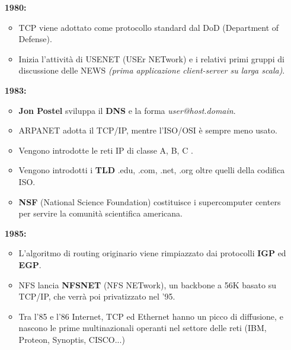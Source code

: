 \documentclass[a4paper,11pt]{article}
\begin{document}
\begin{itemize}
\item[\textbf{1980:}] \begin{itemize}
\item TCP viene adottato come protocollo standard dal DoD (Department of Defense).
\item Inizia l'attività di USENET (USEr NETwork) e i relativi primi gruppi di discussione delle NEWS \textit{(prima applicazione client-server su larga scala)}.
\end{itemize} 

\item[\textbf{1983:}] \begin{itemize}
\item \textbf{Jon Postel} sviluppa il \textbf{DNS} e la forma \textit{user@host.domain}.
\item ARPANET adotta il TCP/IP, mentre l'ISO/OSI è sempre meno usato.
\item Vengono introdotte le reti IP di classe A, B, C	.
\item Vengono introdotti i \textbf{TLD} .edu, .com, .net, .org oltre quelli della codifica ISO.
\item \textbf{NSF} (National Science Foundation) costituisce i supercomputer centers per servire la comunità scientifica americana.
\end{itemize}

\item[\textbf{1985:}] \begin{itemize}
\item L'algoritmo di routing originario viene rimpiazzato dai protocolli \textbf{IGP} ed \textbf{EGP}.
\item NFS lancia \textbf{NFSNET} (NFS NETwork), un backbone a 56K basato su TCP/IP, che verrà poi privatizzato nel '95.
\item Tra l'85 e l'86 Internet, TCP ed Ethernet hanno un picco di diffusione, e nascono le prime multinazionali operanti nel settore delle reti (IBM, Proteon, Synoptis, CISCO...)
\end{itemize}


\end{itemize}
\end{document}

